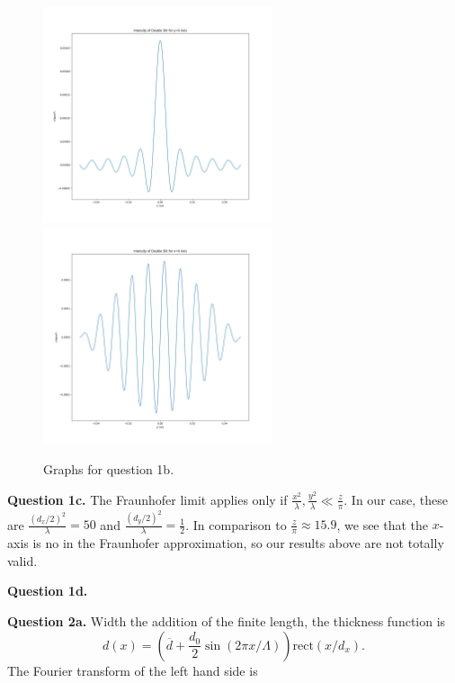 \documentclass[letterpaper, reqno,11pt]{article}
\begin{document}
\begin{figure}[htpb]
    \centering
    \includegraphics[width=0.6\textwidth]{q1x}
    \includegraphics[width=0.6\textwidth]{q1y}
    \caption{Graphs for question 1b.}
    \label{fig:q1b}
\end{figure}

{\medskip\noindent\bf Question 1c.} The Fraunhofer limit applies only if $\frac{x^2}{\lambda}, \frac{y^2}{\lambda} \ll \frac{z}{\pi}$. In our case, these are $\frac{(d_x/2)^2}{\lambda}=50$ and $\frac{(d_y /2)^2}{\lambda}=\frac{1}{2}$. In comparison to $\frac{z}{\pi}\approx 15.9$, we see that the $x$-axis is no in the Fraunhofer approximation, so our results above are not totally valid.

{\medskip\noindent\bf Question 1d.} 


{\medskip\noindent\bf Question 2a.} Width the addition of the finite length, the thickness function is 
\[
    d(x)=\left( \overline{d}+\frac{d_0}{2} \sin\left( 2\pi x /\Lambda \right)  \right)\text{rect}(x /d_x)
.\]
The Fourier transform of the left hand side is 
\end{document}
